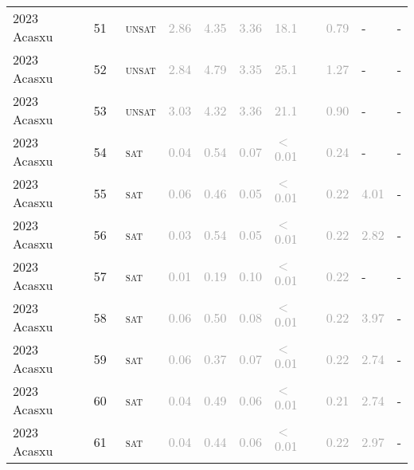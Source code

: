 \begin{center}
{\begin{longtable}{@{}llllllllll@{}}
2023 Acasxu & 51 & ~\textsc{unsat} & \textcolor{darkgray}{2.86} & \textcolor{darkgray}{4.35} & \textcolor{darkgray}{3.36} & \textcolor{darkgray}{18.1} & \textcolor{darkgray}{0.79} & - & - \\
2023 Acasxu & 52 & ~\textsc{unsat} & \textcolor{darkgray}{2.84} & \textcolor{darkgray}{4.79} & \textcolor{darkgray}{3.35} & \textcolor{darkgray}{25.1} & \textcolor{darkgray}{1.27} & - & - \\
2023 Acasxu & 53 & ~\textsc{unsat} & \textcolor{darkgray}{3.03} & \textcolor{darkgray}{4.32} & \textcolor{darkgray}{3.36} & \textcolor{darkgray}{21.1} & \textcolor{darkgray}{0.90} & - & - \\
2023 Acasxu & 54 & ~\textsc{sat} & \textcolor{darkgray}{0.04} & \textcolor{darkgray}{0.54} & \textcolor{darkgray}{0.07} & \textcolor{darkgray}{$<$0.01} & \textcolor{darkgray}{0.24} & - & - \\
2023 Acasxu & 55 & ~\textsc{sat} & \textcolor{darkgray}{0.06} & \textcolor{darkgray}{0.46} & \textcolor{darkgray}{0.05} & \textcolor{darkgray}{$<$0.01} & \textcolor{darkgray}{0.22} & \textcolor{darkgray}{4.01} & - \\
2023 Acasxu & 56 & ~\textsc{sat} & \textcolor{darkgray}{0.03} & \textcolor{darkgray}{0.54} & \textcolor{darkgray}{0.05} & \textcolor{darkgray}{$<$0.01} & \textcolor{darkgray}{0.22} & \textcolor{darkgray}{2.82} & - \\
2023 Acasxu & 57 & ~\textsc{sat} & \textcolor{darkgray}{0.01} & \textcolor{darkgray}{0.19} & \textcolor{darkgray}{0.10} & \textcolor{darkgray}{$<$0.01} & \textcolor{darkgray}{0.22} & - & - \\
2023 Acasxu & 58 & ~\textsc{sat} & \textcolor{darkgray}{0.06} & \textcolor{darkgray}{0.50} & \textcolor{darkgray}{0.08} & \textcolor{darkgray}{$<$0.01} & \textcolor{darkgray}{0.22} & \textcolor{darkgray}{3.97} & - \\
2023 Acasxu & 59 & ~\textsc{sat} & \textcolor{darkgray}{0.06} & \textcolor{darkgray}{0.37} & \textcolor{darkgray}{0.07} & \textcolor{darkgray}{$<$0.01} & \textcolor{darkgray}{0.22} & \textcolor{darkgray}{2.74} & - \\
2023 Acasxu & 60 & ~\textsc{sat} & \textcolor{darkgray}{0.04} & \textcolor{darkgray}{0.49} & \textcolor{darkgray}{0.06} & \textcolor{darkgray}{$<$0.01} & \textcolor{darkgray}{0.21} & \textcolor{darkgray}{2.74} & - \\
2023 Acasxu & 61 & ~\textsc{sat} & \textcolor{darkgray}{0.04} & \textcolor{darkgray}{0.44} & \textcolor{darkgray}{0.06} & \textcolor{darkgray}{$<$0.01} & \textcolor{darkgray}{0.22} & \textcolor{darkgray}{2.97} & - \\

\end{longtable}}
\end{center}
